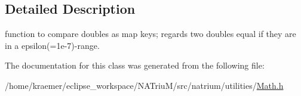 \subsection{Detailed Description}
function to compare doubles as map keys; regards two doubles equal if they are in a epsilon(=1e-\/7)-\/range. 

The documentation for this class was generated from the following file\-:\begin{DoxyCompactItemize}
\item 
/home/kraemer/eclipse\-\_\-workspace/\-N\-A\-Triu\-M/src/natrium/utilities/\hyperlink{Math_8h}{Math.\-h}\end{DoxyCompactItemize}
